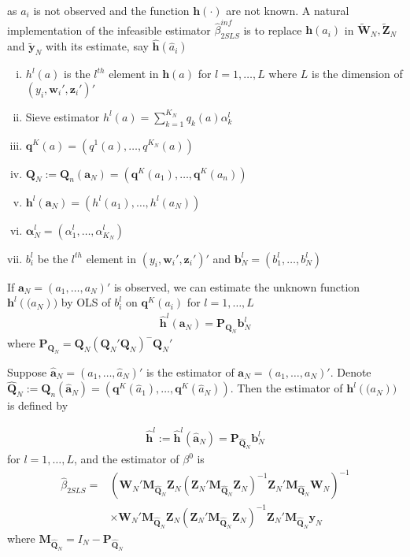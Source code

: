 \documentclass[11pt]{article}
\begin{document}
as $a_i$ is not observed and the function $\mathbf{h}(\cdot)$ are not known. A natural implementation of the infeasible estimator $\hat{\beta}_{2SLS}^{inf}$ is to replace $\mathbf{h}(a_i)$ in $\tilde{\mathbf{W}}_{N},\tilde{\mathbf{Z}}_{N}$ and $\tilde{\mathbf{y}}_{N}$ with its estimate, say $\hat{\mathbf{h}}(\hat{a}_i)$

\begin{enumerate}[(i)]
\item $h^l(a)$ is the $l^{th}$ element in $\mathbf{h}(a)$ for $l = 1,\dots,L$ where $L$ is the dimension of $(y_i,\mathbf{w}_i',\mathbf{z}_i')'$
\item Sieve estimator $h^l(a) = 	\sum_{k=1}^{K_N} q_k(a)\alpha_k^l$
\item $\mathbf{q}^K(a)=(q^1(a), \dots,q^{K_N}(a))$
\item $\mathbf{Q}_N := \mathbf{Q}_n(\mathbf{a}_N) = (\mathbf{q}^K(a_1), \dots,\mathbf{q}^K(a_n))$
\item $\mathbf{h}^l(\mathbf{a}_N) = (h^l(a_1),\dots,h^l(a_N))$
\item $\boldsymbol{\alpha}_N^l = (\alpha_1^l,\dots,\alpha_{K_N}^l)$
\item $b_i^l$ be the $l^{th}$ element in $(y_i,\mathbf{w}_i',\mathbf{z}_i')'$ and $\mathbf{b}_N^l = (b_1^l, \dots , b_N^l)$
\end{enumerate}

If $\mathbf{a}_N = (a_1, \dots, a_N)'$ is observed, we can estimate the unknown function $\mathbf{h}^l(\mathbf(a_N))$ by OLS of $b_i^l$ on $\mathbf{q}^K(a_i)$ for $l=1,\dots,L$
\begin{align}
\hat{\mathbf{h}}^l(\mathbf{a}_N) = \mathbf{P}_{\mathbf{Q}_N} \mathbf{b}_N^l
\end{align}
where $\mathbf{P}_{\mathbf{Q}_N} = \mathbf{Q}_N(\mathbf{Q}_N'\mathbf{Q}_N)^-\mathbf{Q}_N'$

Suppose $\hat{\mathbf{a}}_N = (\hat{a}_1, \dots, \hat{a}_N)'$ is the estimator of  $\mathbf{a}_N = (a_1, \dots, a_N)'$. Denote $\hat{\mathbf{Q}}_N := \mathbf{Q}_n(\hat{\mathbf{a}}_N) = (\mathbf{q}^K(\hat{a}_1), \dots,\mathbf{q}^K(\hat{a}_N))$. Then the estimator of $\mathbf{h}^l(\mathbf(a_N))$ is defined by

\begin{align}
\hat{\mathbf{h}}^l := \hat{\mathbf{h}}^l(\hat{\mathbf{a}}_N) = \mathbf{P}_{\hat{\mathbf{Q}}_N} \mathbf{b}_N^l
\end{align}
for $l=1,\dots,L$, and the estimator of $\beta^0$ is
  \begin{align}
\hat{\beta}_{2SLS} =& (\mathbf{W}_{N}'\mathbf{M}_{\hat{\mathbf{Q}}_N}\mathbf{Z}_{N}(\mathbf{Z}_{N}'\mathbf{M}_{\hat{\mathbf{Q}}_N}\mathbf{Z}_{N})^{-1}\mathbf{Z}_{N}'\mathbf{M}_{\hat{\mathbf{Q}}_N}\mathbf{W}_{N})^{-1} \nonumber \\
&\times \mathbf{W}_{N}'\mathbf{M}_{\hat{\mathbf{Q}}_N}\mathbf{Z}_{N}(\mathbf{Z}_{N}'\mathbf{M}_{\hat{\mathbf{Q}}_N}\mathbf{Z}_{N})^{-1}\mathbf{Z}_{N}'\mathbf{M}_{\hat{\mathbf{Q}}_N}\mathbf{y}_{N} 
  \end{align}
where $\mathbf{M}_{\hat{\mathbf{Q}}_N} = I_N - \mathbf{P}_{\hat{\mathbf{Q}}_N}$
\end{document}
